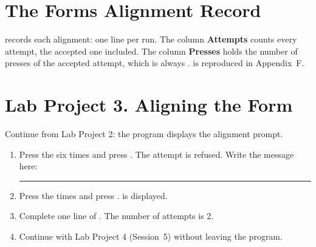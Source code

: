 
\begin{CalloutLegend}
\end{CalloutLegend}

\section{The Forms Alignment Record}
 records each alignment: one line per run.  The column
\textbf{Attempts} counts every attempt, the accepted one included.  The
column \textbf{Presses} holds the number of presses of the accepted attempt,
which is always .   is reproduced in
Appendix~F.

\section{Lab Project 3. Aligning the Form}
Continue from Lab Project 2: the program displays the alignment prompt.
\begin{enumerate}
\item Press the  six times and press .  The attempt
  is refused.  Write the message here:\par
  \rule{\linewidth}{0.4pt}
\item Press the   times and press
  .   is displayed.
\item Complete one line of .  The number of attempts is 2.
\item Continue with Lab Project 4 (Session~5) without leaving the program.
\end{enumerate}


